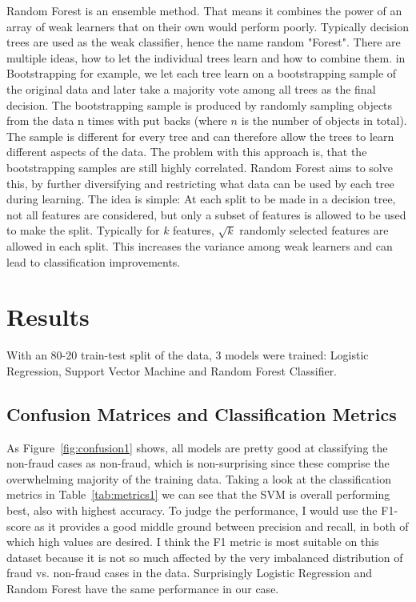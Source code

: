 \documentclass[utf8x]{ctexart}
\begin{document}
Random Forest is an ensemble method. That means it combines the power of an array of weak learners that on their own would perform poorly. Typically decision trees are used as the weak classifier, hence the name random "Forest". There are multiple ideas, how to let the individual trees learn and how to combine them. in Bootstrapping for example, we let each tree learn on a bootstrapping sample of the original data and later take a majority vote among all trees as the final decision. The bootstrapping sample is produced by randomly sampling objects from the data n times with put backs (where $n$ is the number of objects in total). The sample is different for every tree and can therefore allow the trees to learn different aspects of the data. The problem with this approach is, that the bootstrapping samples are still highly correlated. Random Forest aims to solve this, by further diversifying and restricting what data can be used by each tree during learning. The idea is simple: At each split to be made in a decision tree, not all features are considered, but only a subset of features is allowed to be used to make the split. Typically for $k$ features, $\sqrt{k}$ randomly selected features are allowed in each split. This increases the variance among weak learners and can lead to classification improvements.

\section{Results}

With an 80-20 train-test split of the data, 3 models were trained: Logistic Regression, Support Vector Machine and Random Forest Classifier.

\subsection{Confusion Matrices and Classification Metrics}
As Figure~\ref{fig:confusion1} shows, all models are pretty good at classifying the non-fraud cases as non-fraud, which is non-surprising since these comprise the overwhelming majority of the training data.
Taking a look at the classification metrics in Table~\ref{tab:metrics1} we can see that the SVM is overall performing best, also with highest accuracy. To judge the performance, I would use the F1-score as it provides a good middle ground between precision and recall, in both of which high values are desired. I think the F1 metric is most suitable on this dataset because it is not so much affected by the very imbalanced distribution of fraud vs. non-fraud cases in the data. Surprisingly Logistic Regression and Random Forest have the same performance in our case.
\end{document}
